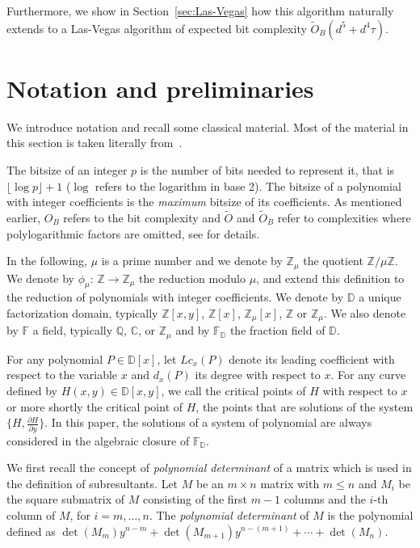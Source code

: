 \documentclass{sig-alternate}
\newcommand {\C}   {\mathbb C}
\newcommand {\D}   {\mathbb D}
\newcommand {\Z}   {\mathbb Z}
\newcommand {\Q}   {\mathbb Q}
\newcommand{\sO}{\ensuremath{\widetilde{{O}}}}
\newcommand{\sOB}{\ensuremath{\widetilde{{O}}_B}}
\newcommand{\blue}[1]{\color{blue}#1\color{black}\xspace}
\renewcommand{\blue}[1]{#1\xspace}
\renewcommand{\leq}{\leqslant}  \renewcommand{\geq}{\geqslant}
\begin{document}
\blue{Furthermore, we show in Section~\ref{sec:Las-Vegas} how this algorithm naturally extends to a Las-Vegas algorithm of
  expected bit complexity $\sOB(d^5+d^4\tau)$.}









\section{Notation and preliminaries}\label{sec:prelim}






We introduce notation and recall some classical material. Most of the material in this section is
taken literally from~\blue{\cite{bouzidiJSC2014a}}. 

 The bitsize of an integer $p$ is the number of bits needed to represent it, that
is $\lfloor\log p\rfloor+1$ ($\log$ refers to the logarithm in base 2). 
The bitsize of a polynomial with integer
coefficients is the \emph{maximum} bitsize of its coefficients. As mentioned
earlier, $O_B$ refers to the bit complexity and $\sO$ and $\sOB$ refer to
complexities where polylogarithmic factors are omitted, see \cite[Def.
25.8]{vzGGer2} for details. 




In the following, $\mu$ is a prime number and we denote by $\Z_\mu$ the quotient
$\Z/\mu\Z$.  We denote by $\phi_\mu$: $\Z \rightarrow \Z_\mu$ the reduction
modulo $\mu$, and extend this definition to the reduction of polynomials with
integer coefficients.  We denote by $\D$ a unique factorization domain,
typically $\Z[x,y]$, $\Z[x]$, $\Z_\mu[x]$, $\Z$ or $\Z_\mu$. We also denote by
 $\mathbb{F}$ a field, typically $\Q$, $\C$, or $\Z_\mu$ and by
 $\mathbb{F}_{\D}$ the fraction field of $\D$.

For any polynomial $P\in \D[x]$, let $Lc_x(P)$ denote its leading coefficient
with respect to the variable $x$ and
$d_x(P)$ its degree with respect to $x$.
For any curve defined by $H(x,y) \in \D[x,y]$, we call the critical points of $H$ with respect to $x$ or more shortly the critical point of $H$, the points that are solutions of the system $\{H,\frac{\partial H}{\partial y}\}$.
In this paper, 
the solutions of a system of polynomial are always considered in the algebraic closure of
$\mathbb{F}_{\D}$. 


\smallskip
{}\quad
We first recall the concept of
\emph{polynomial determinant} of a matrix which is used in the definition of subresultants.
Let $M$ be an $m \times n$ matrix with $m \leq n$ and $M_i$ be the square submatrix of $M$ consisting of the first $m-1$ columns
and the $i$-th column of $M$, for $i=m,\ldots,n$. The \emph{polynomial determinant} of $M$ is the polynomial
defined as $\det(M_{m})y^{n-m}+\det(M_{m + 1})y^{n-(m+1)}+\cdots + \det(M_{n})$.
\end{document}
